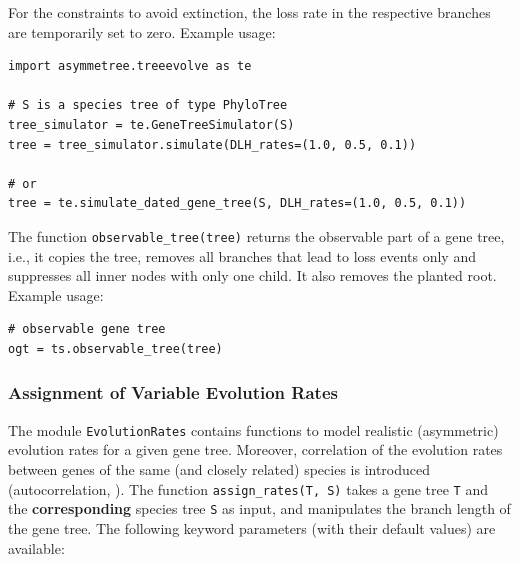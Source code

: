 \documentclass[hidelinks,11pt]{article}
\begin{document}
\noindent
For the constraints to avoid extinction, the loss rate in the respective branches are temporarily set to zero.
Example usage:

\begin{adjustwidth}{1cm}{1cm}\vspace{2mm}
\begin{verbatim}
import asymmetree.treeevolve as te

# S is a species tree of type PhyloTree
tree_simulator = te.GeneTreeSimulator(S)
tree = tree_simulator.simulate(DLH_rates=(1.0, 0.5, 0.1))

# or
tree = te.simulate_dated_gene_tree(S, DLH_rates=(1.0, 0.5, 0.1))
\end{verbatim}
\end{adjustwidth}

The function \texttt{observable\_tree(tree)} returns the observable part of a gene tree, i.e., it copies the tree, removes all branches that lead to loss events only and suppresses all inner nodes with only one child. 
It also removes the planted root.
Example usage:
\begin{adjustwidth}{1cm}{1cm}\vspace{2mm}
\begin{verbatim}
# observable gene tree
ogt = ts.observable_tree(tree)
\end{verbatim}
\end{adjustwidth}


\subsubsection{Assignment of Variable Evolution Rates}

The module \texttt{EvolutionRates} contains functions to model realistic (asymmetric) evolution rates for a given gene tree.
Moreover, correlation of the evolution rates between genes of the same (and closely related) species is introduced (autocorrelation, \citep{kishino2001}).
The function \texttt{assign\_rates(T, S)} takes a gene tree \texttt{T} and the \textbf{corresponding} species tree \texttt{S} as input, and manipulates the branch length of the gene tree.
The following keyword parameters (with their default values) are available:
\end{document}
